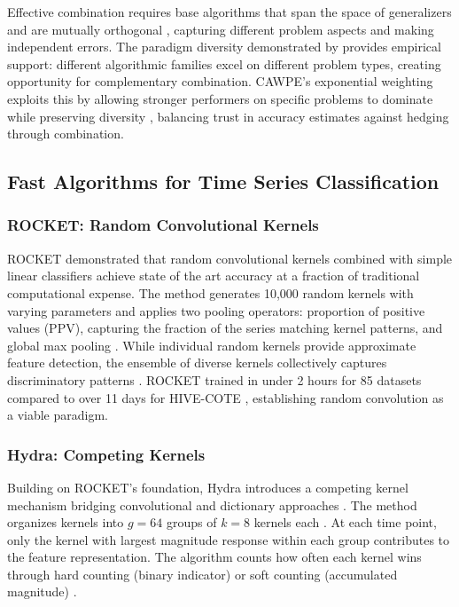 \documentclass[pdflatex,sn-basic]{sn-jnl}           %
\theoremstyle{thmstyleone}%
\theoremstyle{thmstyletwo}%
\theoremstyle{thmstylethree}%
\begin{document}
Effective combination requires base algorithms that span the space of generalizers and are mutually orthogonal \citep[p.~256]{stacked-generalization}, capturing different problem aspects and making independent errors. The paradigm diversity demonstrated by \citet[Table~11, p.~648]{tsc-bakeoff} provides empirical support: different algorithmic families excel on different problem types, creating opportunity for complementary combination. CAWPE's exponential weighting exploits this by allowing stronger performers on specific problems to dominate while preserving diversity \citep[p.~1675]{cawpe}, balancing trust in accuracy estimates against hedging through combination.

\subsection{Fast Algorithms for Time Series Classification}

\subsubsection{ROCKET: Random Convolutional Kernels}

ROCKET \citep{rocket} demonstrated that random convolutional kernels combined with simple linear classifiers achieve state of the art accuracy at a fraction of traditional computational expense. The method generates 10,000 random kernels with varying parameters and applies two pooling operators: proportion of positive values (PPV), capturing the fraction of the series matching kernel patterns, and global max pooling \citep[Section~3, pp.~1462--1463]{rocket}. While individual random kernels provide approximate feature detection, the ensemble of diverse kernels collectively captures discriminatory patterns \citep[p.~1455]{rocket}. ROCKET trained in under 2 hours for 85 datasets compared to over 11 days for HIVE-COTE \citep[p.~1455]{rocket}, establishing random convolution as a viable paradigm.

\subsubsection{Hydra: Competing Kernels}

Building on ROCKET's foundation, Hydra introduces a competing kernel mechanism bridging convolutional and dictionary approaches \citep{hydra}. The method organizes kernels into $g=64$ groups of $k=8$ kernels each \citep[Section~3.2, p.~1788]{hydra}. At each time point, only the kernel with largest magnitude response within each group contributes to the feature representation. The algorithm counts how often each kernel wins through hard counting (binary indicator) or soft counting (accumulated magnitude) \citep[Section~3.2, pp.~1789--1790]{hydra}.
\end{document}
